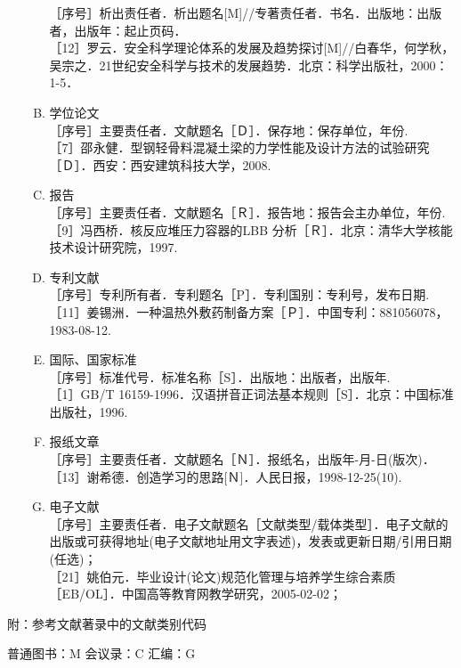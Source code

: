 \begin{enumerate}[1)]
\begin{enumerate}[A.]
        ［序号］析出责任者．析出题名[M]//专著责任者．书名．出版地：出版者，出版年：起止页码．\\
        ［12］罗云．安全科学理论体系的发展及趋势探讨[M]//白春华，何学秋，吴宗之．21世纪安全科学与技术的发展趋势．北京：科学出版社，2000：1-5．
        \item 学位论文\\
        ［序号］主要责任者．文献题名［Ｄ］．保存地：保存单位，年份.\\
        ［7］邵永健．型钢轻骨料混凝土梁的力学性能及设计方法的试验研究［Ｄ］．西安：西安建筑科技大学，2008.
        \item 报告\\
        ［序号］主要责任者．文献题名［Ｒ］．报告地：报告会主办单位，年份.\\
        ［9］冯西桥．核反应堆压力容器的LBB 分析［Ｒ］．北京：清华大学核能技术设计研究院，1997.
        \item 专利文献\\
        ［序号］专利所有者．专利题名［P］．专利国别：专利号，发布日期.\\
        ［11］姜锡洲．一种温热外敷药制备方案［Ｐ］．中国专利：881056078，1983-08-12.
        \item 国际、国家标准\\
        ［序号］标准代号．标准名称［S］．出版地：出版者，出版年.\\
        ［1］GB/T 16159-1996．汉语拼音正词法基本规则［S］．北京：中国标准出版社，1996.
        \item 报纸文章\\
        ［序号］主要责任者．文献题名［Ｎ］．报纸名，出版年-月-日(版次)．\\
        ［13］谢希德．创造学习的思路[Ｎ]．人民日报，1998-12-25(10).
        \item 电子文献\\
        ［序号］主要责任者．电子文献题名［文献类型/载体类型］．电子文献的出版或可获得地址(电子文献地址用文字表述)，发表或更新日期/引用日期(任选)；\\
        ［21］姚伯元．毕业设计(论文)规范化管理与培养学生综合素质［EB/OL］．中国高等教育网教学研究，2005-02-02；
    \end{enumerate}
\end{enumerate}

附：参考文献著录中的文献类别代码

普通图书：M \hspace{2em} 会议录：C \hspace{2em} 汇编：G \hspace{2em} 

